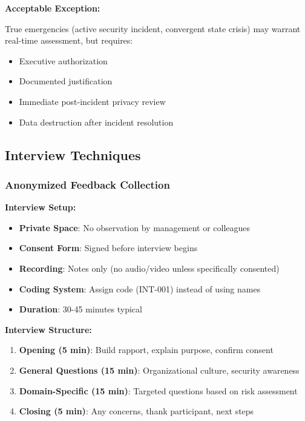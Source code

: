 \documentclass[11pt,a4paper]{article}
\begin{document}
\textbf{Acceptable Exception:}

True emergencies (active security incident, convergent state crisis) may warrant real-time assessment, but requires:
\begin{itemize}
\item Executive authorization
\item Documented justification
\item Immediate post-incident privacy review
\item Data destruction after incident resolution
\end{itemize}

\subsection{Interview Techniques}

\subsubsection{Anonymized Feedback Collection}

\textbf{Interview Setup:}

\begin{itemize}
\item \textbf{Private Space}: No observation by management or colleagues
\item \textbf{Consent Form}: Signed before interview begins
\item \textbf{Recording}: Notes only (no audio/video unless specifically consented)
\item \textbf{Coding System}: Assign code (INT-001) instead of using names
\item \textbf{Duration}: 30-45 minutes typical
\end{itemize}

\textbf{Interview Structure:}

\begin{enumerate}
\item \textbf{Opening (5 min)}: Build rapport, explain purpose, confirm consent
\item \textbf{General Questions (15 min)}: Organizational culture, security awareness
\item \textbf{Domain-Specific (15 min)}: Targeted questions based on risk assessment
\item \textbf{Closing (5 min)}: Any concerns, thank participant, next steps
\end{enumerate}
\end{document}
